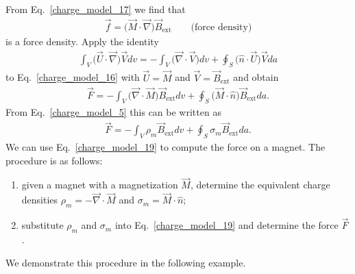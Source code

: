 \documentclass[12pt,a4paper,oneside]{book}
\begin{document}
\begin{onehalfspace}
From Eq.~\eqref{charge_model_17} we find that 
\begin{equation}\label{charge_model_18}
	\boxed{\begin{aligned}
		\vec{f} = \Big(\vec{M}\cdot\vec{\nabla}\Big)\vec{B}_{\text{ext}}\qquad\text{(force density)}
	\end{aligned}}
\end{equation} 
is a force density. Apply the identity 
\begin{equation*}\label{}
	{\begin{aligned}
		\int_{V}\Big(\vec{U}\cdot\vec{\nabla}\Big)\vec{V}dv=-\int_{V}\Big(\vec{\nabla}\cdot\vec{V}\Big)dv+\oint_{S}\Big(\hat{n}\cdot\vec{U}\Big)\vec{V}da
	\end{aligned}}
\end{equation*} 
to Eq.~\eqref{charge_model_16} with $\vec{U}=\vec{M}$ and $\vec{V}=\vec{B}_{\text{ext}}$ and obtain
\begin{equation*}\label{}
	{\begin{aligned}
			\vec{F} =-\int_{V}\Big(\vec{\nabla}\cdot\vec{M}\Big)\vec{B}_{\text{ext}}dv + \oint_{S}\Big(\vec{M}\cdot\hat{n}\Big)\vec{B}_{\text{ext}}da.
	\end{aligned}}
\end{equation*} 
From Eq.~\eqref{charge_model_5} this can be written as
\begin{equation}\label{charge_model_19}
	\boxed{\begin{aligned}
			\vec{F} =-\int_{V}\rho_m\vec{B}_{\text{ext}}dv + \oint_{S}\sigma_m\vec{B}_{\text{ext}}da.
	\end{aligned}}
\end{equation} 
We can use Eq.~\eqref{charge_model_19} to compute the force on a magnet. The procedure is as follows:
\begin{enumerate}
	\item given a magnet with a magnetization $\vec{M}$, determine the equivalent charge densities $\rho_m=-\vec{\nabla}\cdot\vec{M}$ and $\sigma_m=\vec{M}\cdot\hat{n}$;
	\item substitute $\rho_m$ and $\sigma_m$ into Eq.~\eqref{charge_model_19} and determine the force $\vec{F}$.
\end{enumerate}
We demonstrate this procedure in the following example.


\end{onehalfspace}
\end{document}

